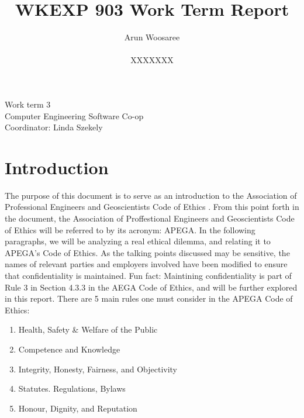 \documentclass[letterpaper,12pt]{article}
\title{WKEXP 903 Work Term Report}
\author{Arun Woosaree \\ \\ XXXXXXX}
\begin{document}
\relax
\begin{titlepage}
 \maketitle
 \thispagestyle{empty} %
 \centering
 \large
 \vspace{1cm}
 Work term 3\\
 \vspace{1cm}
 Computer Engineering Software Co-op \\
 \vspace{1cm}
 Coordinator: Linda Szekely
\end{titlepage}

\section{Introduction}
The purpose of this document is to serve as an introduction to the Association of Professional Engineers and Geoscientists Code of Ethics \cite{apegacode}.
From this point forth in the document, the Association of Proffestional Engineers and Geoscientists Code of Ethics will be referred to by its acronym: APEGA.
In the following paragraphs, we will be analyzing a real ethical dilemma, and relating it to APEGA's Code of Ethics.
As the talking points discussed may be sensitive, the names of relevant parties and employers involved have been modified to ensure that confidentiality is maintained.
Fun fact: Maintining confidentiality is part of Rule 3 in Section 4.3.3 in the AEGA Code of Ethics, and will be further explored in this report.
There are 5 main rules one must consider in the APEGA Code of Ethics:
\begin{enumerate}
    \setlength{\itemsep}{0pt}
    \setlength{\parskip}{0pt}
    \setlength{\parsep}{0pt} 
    \item Health, Safety \& Welfare of the Public
    \item Competence and Knowledge
    \item Integrity, Honesty, Fairness, and Objectivity
    \item Statutes. Regulations, Bylaws
    \item Honour, Dignity, and Reputation
\end{enumerate}
\end{document}
